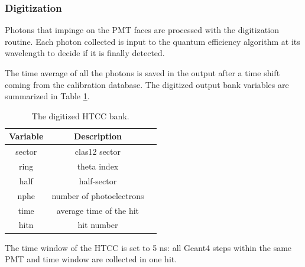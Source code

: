 \subsubsection{Digitization}
Photons that impinge on the PMT faces are processed with the digitization routine.
Each photon collected is input to the quantum efficiency algorithm at its wavelength to decide if it is finally detected.

The time average of all the photons is saved in the output after a time shift coming from the calibration database.
The digitized output bank variables are summarized in Table \ref{tab:htccBank}.

\begin{table}[h]
	\begin{center}
		\begin{tabular}{| c | c | c |}
			\hline \hline
			Variable  & Description                         \\
			\hline
             sector   &                   clas12 sector     \\
             ring     &                     theta index     \\
             half     &                     half-sector     \\
             nphe     &        number of photoelectrons     \\
             time     &         average time of the hit     \\
             hitn     &                      hit number     \\
			\hline \hline
		\end{tabular}
	\end{center}
	\caption{The digitized HTCC bank.}\label{tab:htccBank}
\end{table}

The time window  of the HTCC is set to 5 ns: all Geant4 steps within the same PMT and time window are collected in one hit.
